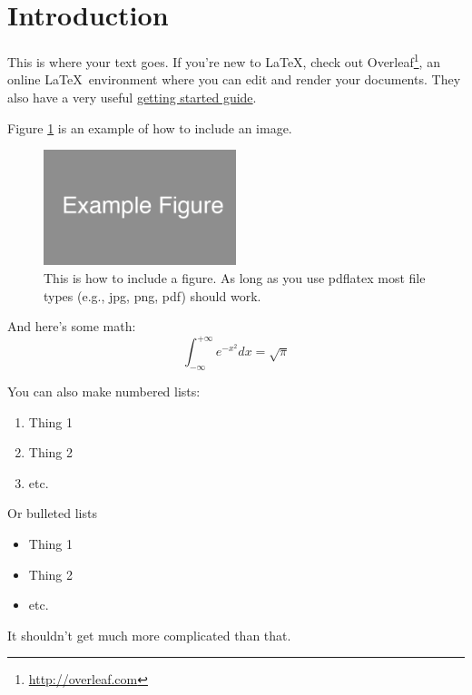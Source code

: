 
\section{Introduction}
This is where your text goes.
If you're new to \LaTeX, check out Overleaf\footnote{\url{http://overleaf.com}}, an online \LaTeX~environment where you can edit and render your documents.
They also have a very useful \href{http://www.overleaf.com/help/18-how-do-i-use-overleaf}{getting started guide}.

Figure \ref{fig:example_figure} is an example of how to include an image.

\begin{figure}[ht]
  \begin{center}
    \includegraphics[width=0.5\textwidth]{figures/example_figure.png}
    \caption{
      This is how to include a figure.
      As long as you use pdflatex most file types (e.g., jpg, png, pdf) should work.}
    \label{fig:example_figure}
  \end{center}
\end{figure}

And here's some math:
\begin{equation}
  \int_{-\infty}^{+\infty} e^{-x^2} dx = \sqrt{\pi}
\end{equation}

You can also make numbered lists:
\begin{enumerate}
  \item Thing 1
  \item Thing 2
  \item etc.
\end{enumerate}

Or bulleted lists
\begin{itemize}
  \item Thing 1
  \item Thing 2
  \item etc.
\end{itemize}

It shouldn't get much more complicated than that.
